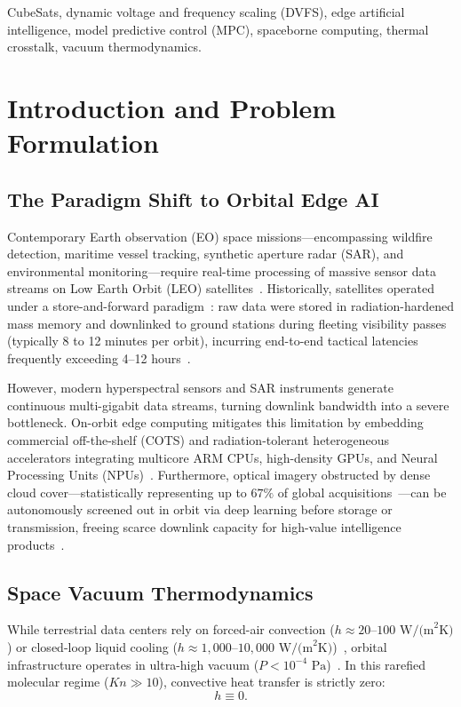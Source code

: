 \documentclass[journal]{IEEEtran}
\begin{document}
\begin{IEEEkeywords}
CubeSats, dynamic voltage and frequency scaling (DVFS), edge artificial intelligence, model predictive control (MPC), spaceborne computing, thermal crosstalk, vacuum thermodynamics.
\end{IEEEkeywords}

\section{Introduction and Problem Formulation}

\subsection{The Paradigm Shift to Orbital Edge AI}
Contemporary Earth observation (EO) space missions---encompassing wildfire detection, maritime vessel tracking, synthetic aperture radar (SAR), and environmental monitoring---require real-time processing of massive sensor data streams on Low Earth Orbit (LEO) satellites~\cite{denby2020asplos, garrett2024taes, chen2026sagin}. Historically, satellites operated under a store-and-forward paradigm~\cite{manson1966fatigue, ecss2008thermal}: raw data were stored in radiation-hardened mass memory and downlinked to ground stations during fleeting visibility passes (typically 8 to 12 minutes per orbit), incurring end-to-end tactical latencies frequently exceeding 4--12 hours~\cite{denby2020asplos, garrett2024taes}.

However, modern hyperspectral sensors and SAR instruments generate continuous multi-gigabit data streams, turning downlink bandwidth into a severe bottleneck. On-orbit edge computing mitigates this limitation by embedding commercial off-the-shelf (COTS) and radiation-tolerant heterogeneous accelerators integrating multicore ARM CPUs, high-density GPUs, and Neural Processing Units (NPUs)~\cite{garrett2024taes, sherwood2003ase}. Furthermore, optical imagery obstructed by dense cloud cover---statistically representing up to $67\%$ of global acquisitions~\cite{king2013spatial}---can be autonomously screened out in orbit via deep learning before storage or transmission, freeing scarce downlink capacity for high-value intelligence products~\cite{giuffrida2021phisat1}.

\subsection{Space Vacuum Thermodynamics}
While terrestrial data centers rely on forced-air convection ($h \approx 20\text{--}100\text{ W/(m}^2\text{K)}$) or closed-loop liquid cooling ($h \approx 1,000\text{--}10,000\text{ W/(m}^2\text{K)}$)~\cite{incropera2011fundamentals}, orbital infrastructure operates in ultra-high vacuum ($P < 10^{-4}\text{ Pa}$)~\cite{nasa2022handbook, gilmore2002handbook}. In this rarefied molecular regime ($Kn \gg 10$), convective heat transfer is strictly zero:
\begin{equation}
h \equiv 0.
\end{equation}
\end{document}
